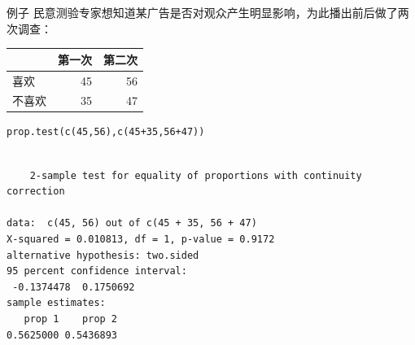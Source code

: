 \documentclass[presentation]{beamer}
\begin{document}
\begin{frame}[fragile,label={sec:org506dab3}]{例子}
 民意测验专家想知道某广告是否对观众产生明显影响，为此播出前后做了两次调查：

\begin{center}
\begin{tabular}{lrr}
 & 第一次 & 第二次\\
\hline
喜欢 & 45 & 56\\
不喜欢 & 35 & 47\\
\end{tabular}
\end{center}

\begin{verbatim}
prop.test(c(45,56),c(45+35,56+47))
\end{verbatim}

\begin{verbatim}

	2-sample test for equality of proportions with continuity correction

data:  c(45, 56) out of c(45 + 35, 56 + 47)
X-squared = 0.010813, df = 1, p-value = 0.9172
alternative hypothesis: two.sided
95 percent confidence interval:
 -0.1374478  0.1750692
sample estimates:
   prop 1    prop 2 
0.5625000 0.5436893 

\end{verbatim}
\end{frame}
\end{document}
